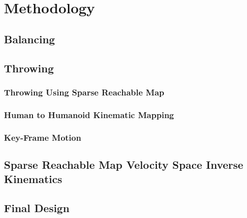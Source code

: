 \chapter{Methodology}


\section{Balancing}\label{sec:sec:balance}
	




\section{Throwing}\label{sec:baseball}
	
	
	\subsection{Throwing Using Sparse Reachable Map}\label{sec:sec:srm}
		

	\subsection{Human to Humanoid Kinematic Mapping}\label{sec:sec:mocap}
		

	\subsection{Key-Frame Motion}\label{sec:sec:keyframe}
		

\section{Sparse Reachable Map Velocity Space Inverse Kinematics}\label{sec:srm}
		
		


\section{Final Design}\label{sec:finalDesign}
	

